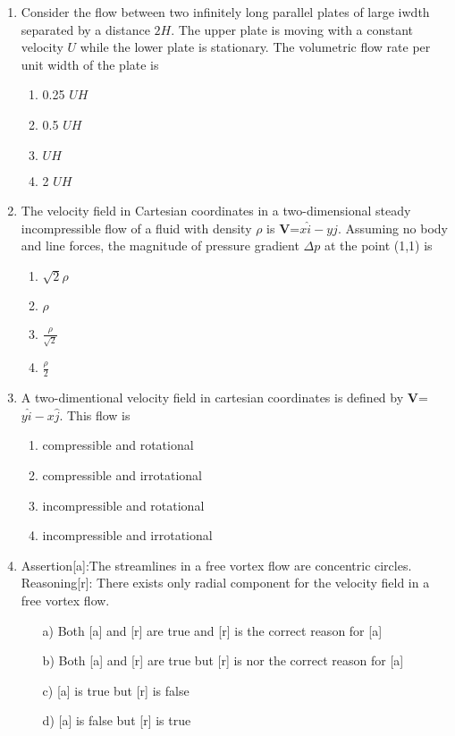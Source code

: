 \documentclass[journal]{IEEEtran}
\begin{document}
\begin{enumerate}
\item Consider the flow between two infinitely long parallel plates of large iwdth separated by a distance $2H$. The upper plate is moving with a constant velocity $U$ while the lower plate is stationary. The volumetric flow rate per unit width of the plate is 
\begin{multicols}{2}
    \begin{enumerate}
        \item 0.25 $UH$
         \item 0.5 $UH$
          \item  $UH$
           \item 2 $UH$
    \end{enumerate}
\end{multicols}
\vspace{0.5cm}
\item The velocity field in Cartesian coordinates in a two-dimensional steady incompressible flow of a fluid with density $\rho$ is \textbf{V}=$x\hat{i}-y\hat{j}$. Assuming no body and line forces, the magnitude of pressure gradient $\Delta p$ at the point (1,1) is
\begin{multicols}{2}
    \begin{enumerate}
        \item $\sqrt{2}\rho$
        \item $\rho$
        \item $\frac{\rho}{\sqrt{2}}$
        \item $\frac{\rho}{2}$
    \end{enumerate}
\end{multicols}

\item A two-dimentional velocity field in cartesian coordinates is defined by \textbf{V}=$y\hat{i}-x\hat{j}$. This flow is 
\begin{multicols}{2}
    \begin{enumerate}
        \item compressible and rotational 
        \item compressible and irrotational 
        \item incompressible and rotational 
        \item incompressible and irrotational 
    \end{enumerate}
\end{multicols}
\item Assertion[a]:The streamlines in a free vortex flow are concentric circles.\\
Reasoning[r]: There exists only radial component for the velocity field in a free vortex flow.
\begin{enumerate}
    \item[a)] Both [a] and [r] are true and [r] is the correct reason for [a]
    \item[b)] Both [a] and [r] are true but [r] is nor the correct reason for [a]
    \item[c)]  [a] is true but [r] is false 
    \item[d)]  [a] is false but [r] is true    
\end{enumerate}


\end{enumerate}
\end{document}
